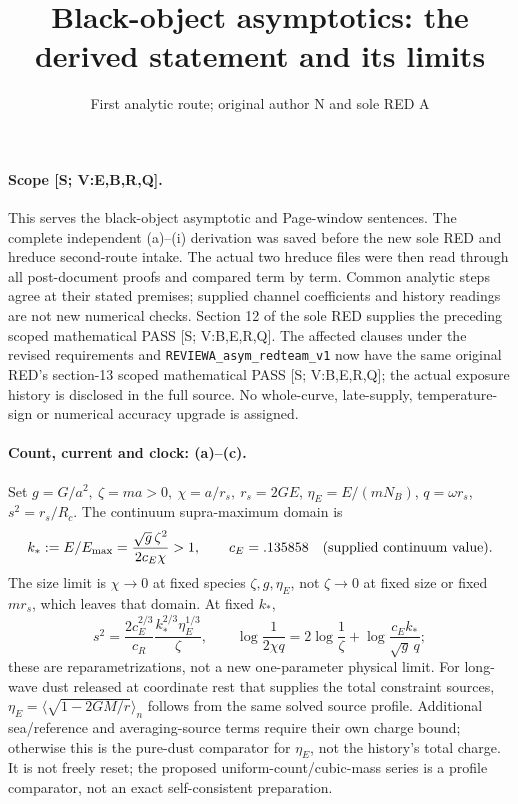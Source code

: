 \documentclass[10pt]{article}
\begin{document}
\title{Black-object asymptotics: the derived statement and its limits}
\author{First analytic route; original author N and sole RED A}
\date{}
\maketitle

\paragraph{Scope [S; V:E,B,R,Q].}
This serves the black-object asymptotic and Page-window sentences.
The complete independent (a)--(i) derivation was saved before
the new sole RED and hreduce second-route intake. The actual
two hreduce files were then read through all post-document
proofs and compared term by term. Common analytic steps
agree at their stated premises; supplied channel coefficients
and history readings are not new numerical checks.
Section 12 of the sole RED supplies the preceding scoped
mathematical PASS [S; V:B,E,R,Q]. The affected clauses under
the revised requirements and \texttt{REVIEWA\_asym\_redteam\_v1}
now have the same original RED's section-13 scoped mathematical
PASS [S; V:B,E,R,Q]; the actual exposure history is disclosed
in the full source.
No whole-curve, late-supply, temperature-sign or numerical
accuracy upgrade is assigned.

\paragraph{Count, current and clock: (a)--(c).}
Set \(g=G/a^2,\ \zeta=ma>0,\ \chi=a/r_s,\ r_s=2GE\),
\(\eta_E=E/(mN_B)\), \(q=\omega r_s\), \(s^2=r_s/R_c\).
The continuum supra-maximum domain is
\[
 k_*:=E/E_{\max}=\frac{\sqrt g\,\zeta^2}{2c_E\chi}>1,
 \qquad c_E=.135858\quad\hbox{(supplied continuum value)}.
\]
The size limit is \(\chi\to0\) at fixed species
\(\zeta,g,\eta_E\), not \(\zeta\to0\) at fixed size or
fixed \(mr_s\), which leaves that domain. At fixed \(k_*\),
\[
 s^2=\frac{2c_E^{2/3}}{c_R}
      \frac{k_*^{2/3}\eta_E^{1/3}}{\zeta},\qquad
 \log\frac1{2\chi q}=2\log\frac1\zeta+
                      \log\frac{c_Ek_*}{\sqrt g\,q};
\]
these are reparametrizations, not a new one-parameter physical
limit. For long-wave dust released at coordinate rest that
supplies the total constraint sources,
\(\eta_E=\langle\sqrt{1-2GM/r}\rangle_n\) follows from
the same solved source profile. Additional sea/reference and
averaging-source terms require their own charge bound; otherwise
this is the pure-dust comparator for \(\eta_E\), not the
history's total charge. It is not freely reset;
the proposed uniform-count/cubic-mass series is a profile
comparator, not an exact self-consistent preparation.
\end{document}
